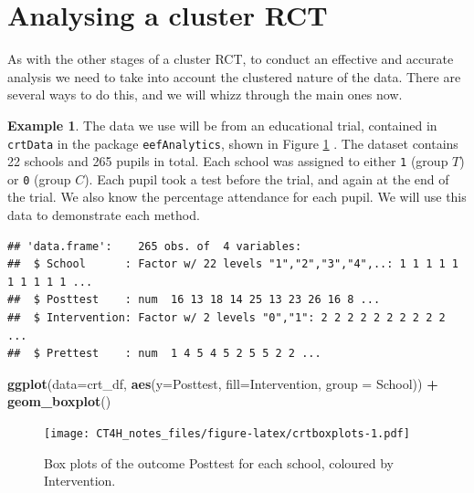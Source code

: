 \documentclass[
  openany]{book}
\newenvironment{Shaded}{\begin{snugshade}}{\end{snugshade}}
\newcommand{\AttributeTok}[1]{\textcolor[rgb]{0.13,0.29,0.53}{#1}}
\newcommand{\FunctionTok}[1]{\textcolor[rgb]{0.13,0.29,0.53}{\textbf{#1}}}
\newcommand{\NormalTok}[1]{#1}
\newcommand{\SpecialCharTok}[1]{\textcolor[rgb]{0.81,0.36,0.00}{\textbf{#1}}}
\theoremstyle{definition}
\theoremstyle{definition}
\newtheorem{example}{Example}[chapter]
\theoremstyle{definition}
\theoremstyle{definition}
\theoremstyle{remark}
\begin{document}
\hypertarget{analysing-a-cluster-rct}{%
\section{Analysing a cluster RCT}\label{analysing-a-cluster-rct}}

As with the other stages of a cluster RCT, to conduct an effective and accurate analysis we need to take into account the clustered nature of the data. There are several ways to do this, and we will whizz through the main ones now.

\begin{example}

The data we use will be from an educational trial, contained in \texttt{crtData} in the package \texttt{eefAnalytics}, shown in Figure \ref{fig:crtboxplots} . The dataset contains 22 schools and 265 pupils in total. Each school was assigned to either \texttt{1} (group \(T\)) or \texttt{0} (group \(C\)). Each pupil took a test before the trial, and again at the end of the trial. We also know the percentage attendance for each pupil. We will use this data to demonstrate each method.

\begin{verbatim}
## 'data.frame':    265 obs. of  4 variables:
##  $ School      : Factor w/ 22 levels "1","2","3","4",..: 1 1 1 1 1 1 1 1 1 1 ...
##  $ Posttest    : num  16 13 18 14 25 13 23 26 16 8 ...
##  $ Intervention: Factor w/ 2 levels "0","1": 2 2 2 2 2 2 2 2 2 2 ...
##  $ Prettest    : num  1 4 5 4 5 2 5 5 2 2 ...
\end{verbatim}

\begin{Shaded}
\begin{Highlighting}[]
\FunctionTok{ggplot}\NormalTok{(}\AttributeTok{data=}\NormalTok{crt\_df, }\FunctionTok{aes}\NormalTok{(}\AttributeTok{y=}\NormalTok{Posttest, }\AttributeTok{fill=}\NormalTok{Intervention, }\AttributeTok{group =}\NormalTok{ School)) }\SpecialCharTok{+} \FunctionTok{geom\_boxplot}\NormalTok{()}
\end{Highlighting}
\end{Shaded}

\begin{figure}
\centering
\texttt{[image: CT4H\_notes\_files/figure-latex/crtboxplots-1.pdf]}
\caption{\label{fig:crtboxplots}Box plots of the outcome Posttest for each school, coloured by Intervention.}
\end{figure}

\end{example}
\end{document}
